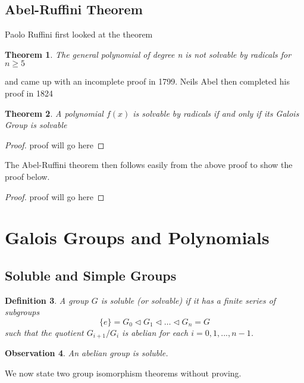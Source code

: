 \documentclass[12pt]{article}
\newtheorem{theorem}{Theorem}
\newtheorem{definition}[theorem]{Definition}
\newtheorem{observation}[theorem]{\textbf{Observation}}
\begin{document}
\subsection{Abel-Ruffini Theorem}

Paolo Ruffini first looked at the theorem

\begin{theorem}
    The general polynomial of degree n is not solvable
by radicals for $n \ge 5$
\end{theorem}

and came up with an incomplete proof in 1799. Neils Abel then completed his proof in 1824

\begin{theorem}
    A polynomial $f(x)$ is solvable by radicals if and only if its Galois Group is solvable
\end{theorem}

\begin{proof}
    proof will go here
\end{proof}

The Abel-Ruffini theorem then follows easily from the above proof to show the proof below.

\begin{proof}
proof will go here    
\end{proof}


\section{Galois Groups and Polynomials}

\subsection{Soluble and Simple Groups}

\begin{definition} \label{def:soluble}
    A group $G$ is soluble (or solvable) if it has a finite series of subgroups 
    $$ \{ e \} = G_0 \triangleleft G_1 \triangleleft \dots \triangleleft G_n = G$$
    such that the quotient $G_{i+1} / G_{i}$ is abelian for each $i = 0, 1, ...,  n - 1$.
\end{definition}

\begin{observation}
    An abelian group is soluble. 
\end{observation}

We now state two group isomorphism theorems without proving. 
\end{document}
